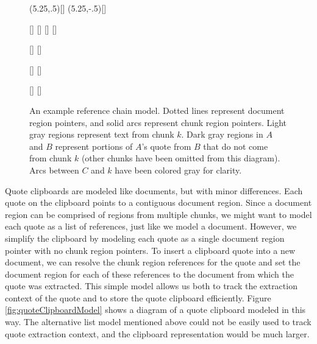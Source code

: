 \documentclass{acm_proc_article-sp}
\begin{document}
\begin{figure*}[t]
\begin{center}
\begin{graph}
(5.25,.5)[]
(5.25,-.5)[]




[]
[]
[]
[]

[]
[]

[]
[]


[]
[]


\end{graph}

\caption{An example reference chain model.  Dotted lines represent document region pointers, and solid arcs represent chunk region pointers.  Light gray regions represent text from chunk $k$.  Dark gray regions in $A$ and $B$ represent portions of $A$'s quote from $B$ that do not come from chunk $k$ (other chunks have been omitted from this diagram).  Arcs between $C$ and $k$ have been colored gray for clarity.}
\label{fig:referenceChain}

\end{center}

\end{figure*}





Quote clipboards are modeled like documents, but with minor differences.
Each quote on the clipboard points to a contiguous document region.
Since a  document region can be comprised of regions from multiple chunks, we might want to model each quote as a list of references, just like we model a document.
However, we simplify the clipboard by modeling each quote as a single document region pointer with no chunk region pointers.
To insert a clipboard quote into a new document, we can resolve the chunk region references for the quote and set the document region for each of these references to the document from which the quote was extracted.
This simple model allows us both to track the extraction context of the quote and to store the quote clipboard efficiently.
Figure \ref{fig:quoteClipboardModel} shows a diagram of a quote clipboard modeled in this way.
The alternative list model mentioned above could not be easily used to track quote extraction context, and the clipboard representation would be much larger.
\end{document}
